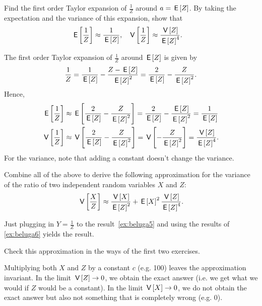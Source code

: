 \documentclass[assignments]{subfiles}
\begin{document}
\begin{exercise}  \label{ex:beluga6}
Find the first order Taylor expansion of $\frac{1}{Z}$ around $a=  \,\mathsf{E}\left[Z\right]$. By taking the expectation and the variance of this expansion, show that
\begin{align*}
\,\mathsf{E}\left[\frac{1}{Z}\right] &\approx \frac{1}{\,\mathsf{E}\left[Z\right]}, & \,\mathsf{V}\left[\frac{1}{Z}\right] &\approx \frac{\,\mathsf{V}\left[Z\right]}{\,\mathsf{E}\left[Z\right]^4}.
\end{align*}
\begin{solution}
The first order Taylor expansion of $\frac{1}{Z}$ around $\,\mathsf{E}\left[Z\right]$ is given by $$\frac{1}{Z} = \frac{1}{\,\mathsf{E}\left[Z\right]} -  \frac{Z-\,\mathsf{E}\left[Z\right]}{\,\mathsf{E}\left[Z\right]^2} =  \frac{2}{\,\mathsf{E}\left[Z\right]} -  \frac{Z}{\,\mathsf{E}\left[Z\right]^2}.$$ Hence,
\begin{align*}
\,\mathsf{E}\left[\frac{1}{Z}\right] &\approx \,\mathsf{E}\left[\frac{2}{\,\mathsf{E}\left[Z\right]} -  \frac{Z}{\,\mathsf{E}\left[Z\right]^2}\right] = \frac{2}{\,\mathsf{E}\left[Z\right]}  -  \frac{\,\mathsf{E}\left[Z\right]}{\,\mathsf{E}\left[Z\right]^2}  = \frac{1}{\,\mathsf{E}\left[Z\right]} \\
\,\mathsf{V}\left[\frac{1}{Z}\right] &\approx \,\mathsf{V}\left[\frac{2}{\,\mathsf{E}\left[Z\right]} -  \frac{Z}{\,\mathsf{E}\left[Z\right]^2}\right] =  \,\mathsf{V}\left[-  \frac{Z}{\,\mathsf{E}\left[Z\right]^2}\right] = \frac{\,\mathsf{V}\left[Z\right]}{\,\mathsf{E}\left[Z\right]^4}.
\end{align*}
For the variance, note that adding a constant doesn't change the variance.
\end{solution}
\end{exercise}

\begin{exercise}
Combine all of the above to derive the following approximation for the variance of the ratio of two independent random variables $X$ and $Z$:
\begin{equation*}
\,\mathsf{V}\left[\frac{X}{Z}\right] \approx \frac{\,\mathsf{V}\left[X\right]}{\,\mathsf{E}\left[Z\right]^2} + \,\mathsf{E}\left[X\right]^2\frac{\,\mathsf{V}\left[Z\right]}{\,\mathsf{E}\left[Z\right]^4}.
\end{equation*}
\begin{solution}
Just plugging in $Y = \frac{1}{Z}$ to the result~\cref{ex:beluga5} and  using the results of \cref{ex:beluga6} yields the result.
\end{solution}
\end{exercise}


\begin{exercise}
Check this approximation in the ways of the first two exercises.
\begin{solution}
Multiplying both $X$ and $Z$ by a constant $c$ (e.g. 100) leaves the approximation invariant. In the limit $\,\mathsf{V}\left[Z\right] \rightarrow 0$, we obtain the exact answer (i.e. we get what we would if $Z$ would be a constant). In the limit $\,\mathsf{V}\left[X\right] \rightarrow 0$, we do not obtain the exact answer but also not something that is completely wrong (e.g. 0). \\
\end{solution}
\end{exercise}
\end{document}
